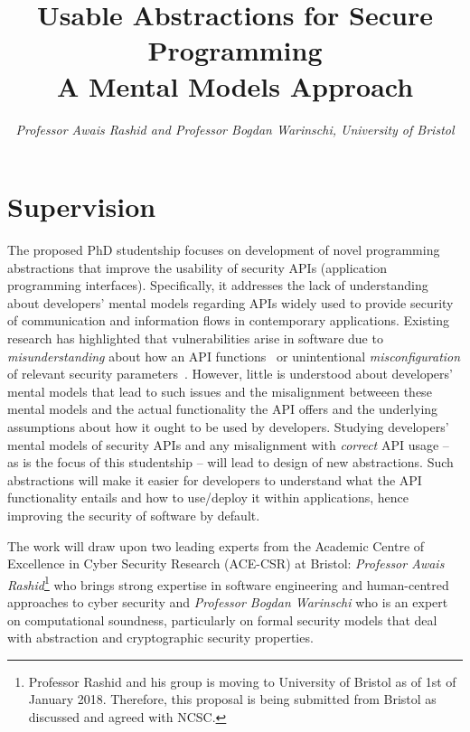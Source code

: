 \documentclass[10pt]{article}
\date{}
\title{\bf{Usable Abstractions for Secure Programming\\ A Mental Models Approach}}
\author{\textit{Professor Awais Rashid and Professor Bogdan Warinschi, University of Bristol}}
\begin{document}
\maketitle


\section{Supervision}

The proposed PhD studentship focuses on development of novel programming abstractions that improve the usability of security APIs (application programming interfaces). Specifically, it addresses the lack of understanding about developers' mental models regarding APIs widely used to provide security of communication and information flows in contemporary applications. Existing research has highlighted that vulnerabilities arise in software due to \emph{misunderstanding} about how an API functions~\cite{nadi2016} or unintentional \emph{misconfiguration} of relevant security parameters~\cite{enck2011, fahl2012}. However, little is understood about developers' mental models that lead to such issues and the misalignment betweeen these mental models and the actual functionality the API offers and the underlying assumptions about how it ought to be used by developers. Studying developers' mental models of security APIs and any misalignment with \emph{correct} API usage -- as is the focus of this studentship -- will lead to design of new abstractions. Such abstractions will make it easier for developers to understand what the API functionality entails and how to use/deploy it within applications, hence improving the security of software by default. 

The work will draw upon two leading experts from the Academic Centre of Excellence in Cyber Security Research (ACE-CSR) at Bristol: \textit{Professor Awais Rashid}\footnote{Professor Rashid and his group is moving to University of Bristol as of 1st of January 2018. Therefore, this proposal is being submitted from Bristol as discussed and agreed with NCSC.} who brings strong expertise in software engineering and human-centred approaches to cyber security and \textit{Professor Bogdan Warinschi} who is an expert on computational soundness, particularly on formal security models that deal with abstraction and cryptographic security properties. 
\end{document}
